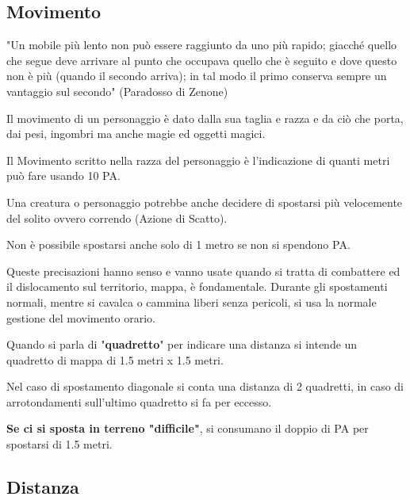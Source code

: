 \documentclass[12pt,a4paper,twoside,openany]{book}
\begin{document}
\subsection{Movimento}\label{movimento}


\begin{changemargin}{0.3cm}{0.3cm}\begin{enfasi}{"Un mobile più lento non può essere raggiunto da uno più rapido; giacché quello che segue deve arrivare al punto che occupava quello che è seguito e dove questo non è più (quando il secondo arriva); in tal modo il primo conserva sempre un vantaggio sul secondo" (Paradosso di Zenone)}
\end{enfasi}\end{changemargin}

\begin{multicols}{2}

Il movimento di un personaggio è dato dalla sua taglia e razza e da ciò che porta, dai pesi, ingombri ma anche magie ed oggetti magici.

Il Movimento scritto nella razza del personaggio è l'indicazione di quanti metri può fare usando 10 PA.

Una creatura o personaggio potrebbe anche decidere di spostarsi più velocemente del solito ovvero correndo (Azione di Scatto).

Non è possibile spostarsi anche solo di 1 metro se non si spendono PA.

Queste precisazioni hanno senso e vanno usate quando si tratta di combattere ed il dislocamento sul territorio, mappa, è fondamentale. Durante gli spostamenti normali, mentre si cavalca o cammina liberi senza pericoli, si usa la normale gestione del movimento orario.

Quando si parla di "\textbf{quadretto}" per indicare una distanza si intende un quadretto di mappa di 1.5 metri x 1.5 metri.

Nel caso di spostamento diagonale si conta una distanza di 2 quadretti, in caso di arrotondamenti sull'ultimo quadretto si fa per eccesso.

\textbf{Se ci si sposta in terreno "difficile"}, si consumano il doppio di PA per spostarsi di 1.5 metri.

\subsection{Distanza}\label{distanza}


\end{multicols}
\end{document}
